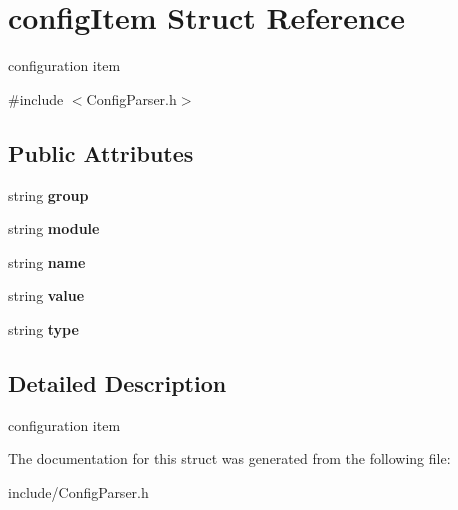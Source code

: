 \hypertarget{structconfigItem}{}\section{config\+Item Struct Reference}
\label{structconfigItem}


configuration item  




{\ttfamily \#include $<$Config\+Parser.\+h$>$}

\subsection*{Public Attributes}
\begin{DoxyCompactItemize}
\item 
\mbox{\label{structconfigItem_a8bd065514c64d606dc2c7b74f995eaf6}} 
string {\bfseries group}
\item 
\mbox{\label{structconfigItem_a5777d37b02899012de8b8e9750054e2b}} 
string {\bfseries module}
\item 
\mbox{\label{structconfigItem_a53010d9f4f57d979a3798a28126d7d9d}} 
string {\bfseries name}
\item 
\mbox{\label{structconfigItem_afc9fecce2bdc20bd6a1d63785300c210}} 
string {\bfseries value}
\item 
\mbox{\label{structconfigItem_a36f596e7068403288accf722523cbbbf}} 
string {\bfseries type}
\end{DoxyCompactItemize}


\subsection{Detailed Description}
configuration item 

The documentation for this struct was generated from the following file\+:\begin{DoxyCompactItemize}
\item 
include/Config\+Parser.\+h\end{DoxyCompactItemize}
